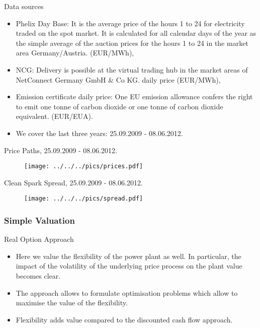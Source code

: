 {Data sources}
\begin{itemize}
\item Phelix Day Base: It is the average price of the hours 1 to 24 for electricity traded on the spot market.
It is calculated for all calendar days of the year as the simple average of the auction prices for the
hours 1 to 24 in the market area Germany/Austria. (EUR/MWh),
\item NCG: Delivery is possible at the virtual trading hub in the market areas of
NetConnect Germany GmbH \& Co KG. daily price (EUR/MWh),
\item Emission certificate daily price: One EU emission allowance confers the right to emit one tonne of carbon dioxide or one tonne of
carbon dioxide equivalent. (EUR/EUA).
\item We cover the last three years: 25.09.2009 - 08.06.2012.
\end{itemize}


{Price Paths, 25.09.2009 - 08.06.2012.}
\begin{figure}[htp]
\centering
\texttt{[image: ../../../pics/prices.pdf]}
\label{prices}
\end{figure}


{Clean Spark Spread, 25.09.2009 - 08.06.2012.}
\begin{figure}[htp]
\centering
\texttt{[image: ../../../pics/spread.pdf]}
\label{spread}
\end{figure}


\subsubsection{Simple Valuation}


{Real Option Approach}
\begin{itemize}
\item<1-> Here we value the flexibility of the power plant as well. In particular, the impact of the volatility of the underlying price process on the plant value becomes clear.
\item<2-> The approach allows to formulate optimisation problems which allow to maximise the value of the flexibility.
\item<3-> Flexibility adds value compared to the discounted cash flow approach.
\end{itemize}




